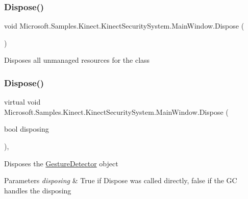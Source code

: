 \subsubsection{\texorpdfstring{Dispose()}{Dispose()}\hspace{0.1cm}{\footnotesize\ttfamily [1/2]}}
{\footnotesize\ttfamily void Microsoft.\+Samples.\+Kinect.\+Kinect\+Security\+System.\+Main\+Window.\+Dispose (\begin{DoxyParamCaption}{ }\end{DoxyParamCaption})}



Disposes all unmanaged resources for the class 

\mbox{\label{class_microsoft_1_1_samples_1_1_kinect_1_1_kinect_security_system_1_1_main_window_a39200cb7da268b1502bca94a7d9146a0}} 
\subsubsection{\texorpdfstring{Dispose()}{Dispose()}\hspace{0.1cm}{\footnotesize\ttfamily [2/2]}}
{\footnotesize\ttfamily virtual void Microsoft.\+Samples.\+Kinect.\+Kinect\+Security\+System.\+Main\+Window.\+Dispose (\begin{DoxyParamCaption}\item[{bool}]{disposing }\end{DoxyParamCaption})\hspace{0.3cm}{\ttfamily [protected]}, {\ttfamily [virtual]}}



Disposes the \hyperlink{class_microsoft_1_1_samples_1_1_kinect_1_1_kinect_security_system_1_1_gesture_detector}{Gesture\+Detector} object 


\begin{DoxyParams}{Parameters}
{\em disposing} & True if Dispose was called directly, false if the GC handles the disposing\\
\hline
\end{DoxyParams}



